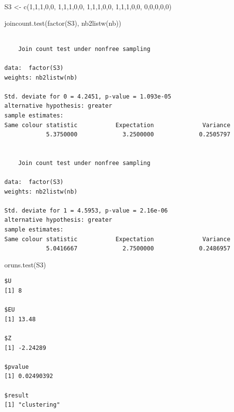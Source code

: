 \documentclass[
  letterpaper,
  DIV=11,
  numbers=noendperiod]{scrreprt}
\newenvironment{Shaded}{\begin{snugshade}}{\end{snugshade}}
\newcommand{\DecValTok}[1]{\textcolor[rgb]{0.68,0.00,0.00}{#1}}
\newcommand{\FunctionTok}[1]{\textcolor[rgb]{0.28,0.35,0.67}{#1}}
\newcommand{\NormalTok}[1]{\textcolor[rgb]{0.00,0.23,0.31}{#1}}
\newcommand{\OtherTok}[1]{\textcolor[rgb]{0.00,0.23,0.31}{#1}}
\begin{document}
\begin{Shaded}
\begin{Highlighting}[]
\NormalTok{S3 }\OtherTok{\textless{}{-}} \FunctionTok{c}\NormalTok{(}\DecValTok{1}\NormalTok{,}\DecValTok{1}\NormalTok{,}\DecValTok{1}\NormalTok{,}\DecValTok{0}\NormalTok{,}\DecValTok{0}\NormalTok{,}
       \DecValTok{1}\NormalTok{,}\DecValTok{1}\NormalTok{,}\DecValTok{1}\NormalTok{,}\DecValTok{0}\NormalTok{,}\DecValTok{0}\NormalTok{,}
       \DecValTok{1}\NormalTok{,}\DecValTok{1}\NormalTok{,}\DecValTok{1}\NormalTok{,}\DecValTok{0}\NormalTok{,}\DecValTok{0}\NormalTok{,}
       \DecValTok{1}\NormalTok{,}\DecValTok{1}\NormalTok{,}\DecValTok{1}\NormalTok{,}\DecValTok{0}\NormalTok{,}\DecValTok{0}\NormalTok{,}
       \DecValTok{0}\NormalTok{,}\DecValTok{0}\NormalTok{,}\DecValTok{0}\NormalTok{,}\DecValTok{0}\NormalTok{,}\DecValTok{0}\NormalTok{)}

\FunctionTok{joincount.test}\NormalTok{(}\FunctionTok{factor}\NormalTok{(S3), }
                \FunctionTok{nb2listw}\NormalTok{(nb))}
\end{Highlighting}
\end{Shaded}

\begin{verbatim}

    Join count test under nonfree sampling

data:  factor(S3) 
weights: nb2listw(nb) 

Std. deviate for 0 = 4.2451, p-value = 1.093e-05
alternative hypothesis: greater
sample estimates:
Same colour statistic           Expectation              Variance 
            5.3750000             3.2500000             0.2505797 


    Join count test under nonfree sampling

data:  factor(S3) 
weights: nb2listw(nb) 

Std. deviate for 1 = 4.5953, p-value = 2.16e-06
alternative hypothesis: greater
sample estimates:
Same colour statistic           Expectation              Variance 
            5.0416667             2.7500000             0.2486957 
\end{verbatim}

\begin{Shaded}
\begin{Highlighting}[]
\FunctionTok{oruns.test}\NormalTok{(S3)}
\end{Highlighting}
\end{Shaded}

\begin{verbatim}
$U
[1] 8

$EU
[1] 13.48

$Z
[1] -2.24289

$pvalue
[1] 0.02490392

$result
[1] "clustering"
\end{verbatim}
\end{document}
